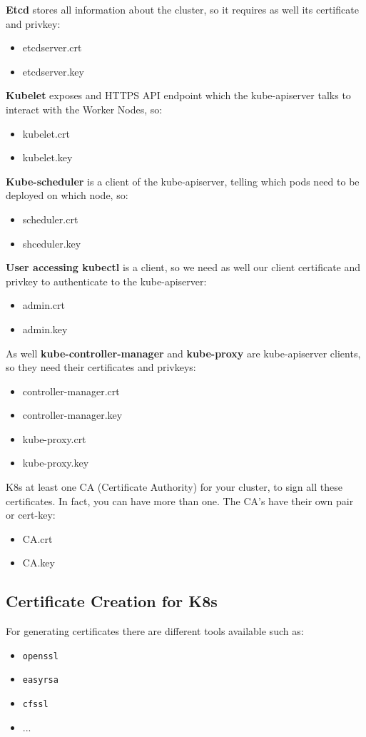 \documentclass{article}
\begin{document}
\textbf{Etcd} stores all information about the cluster, so it requires as well its certificate and privkey:
\begin{itemize}
    \item etcdserver.crt
    \item etcdserver.key
\end{itemize}

\textbf{Kubelet} exposes and HTTPS API endpoint which the kube-apiserver talks to interact with the Worker Nodes, so:
\begin{itemize}
    \item kubelet.crt
    \item kubelet.key
\end{itemize}

\textbf{Kube-scheduler} is a client of the kube-apiserver, telling which pods need to be deployed on which node, so:
\begin{itemize}
    \item scheduler.crt
    \item shceduler.key
\end{itemize}

\textbf{User accessing kubectl} is a client, so we need as well our client certificate and privkey
to authenticate to the kube-apiserver:
\begin{itemize}
    \item admin.crt
    \item admin.key
\end{itemize}

As well \textbf{kube-controller-manager} and \textbf{kube-proxy} are kube-apiserver clients, so they need their certificates and privkeys:
\begin{itemize}
    \item controller-manager.crt
    \item controller-manager.key
    \item kube-proxy.crt
    \item kube-proxy.key
\end{itemize}

K8s at least one CA (Certificate Authority) for your cluster, to sign all these certificates. In fact, you can have more than one. The CA's have their own pair or cert-key:
\begin{itemize}
    \item CA.crt
    \item CA.key
\end{itemize}

\subsection{Certificate Creation for K8s}
For generating certificates there are different tools available such as:
\begin{itemize}
    \item \verb|openssl|
    \item \verb|easyrsa|
    \item \verb|cfssl|
    \item ...
\end{itemize}
\end{document}

